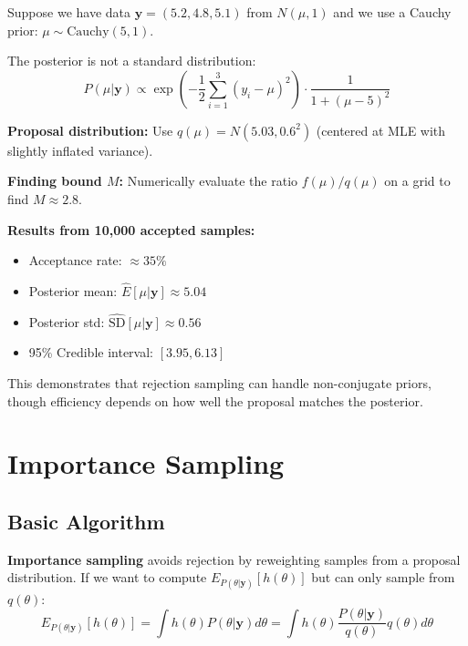 \begin{examplebox}
\begin{example}
Suppose we have data $\mathbf{y} = (5.2, 4.8, 5.1)$ from $N(\mu, 1)$ and we use a Cauchy prior: $\mu \sim \text{Cauchy}(5, 1)$.

The posterior is not a standard distribution:
$$P(\mu|\mathbf{y}) \propto \exp\left(-\frac{1}{2}\sum_{i=1}^3(y_i - \mu)^2\right) \cdot \frac{1}{1 + (\mu-5)^2}$$

\textbf{Proposal distribution:}
Use $q(\mu) = N(5.03, 0.6^2)$ (centered at MLE with slightly inflated variance).

\textbf{Finding bound $M$:}
Numerically evaluate the ratio $f(\mu)/q(\mu)$ on a grid to find $M \approx 2.8$.

\textbf{Results from 10,000 accepted samples:}
\begin{itemize}
\item Acceptance rate: $\approx 35\%$
\item Posterior mean: $\hat{E}[\mu|\mathbf{y}] \approx 5.04$
\item Posterior std: $\hat{\text{SD}}[\mu|\mathbf{y}] \approx 0.56$
\item 95\% Credible interval: $[3.95, 6.13]$
\end{itemize}
This demonstrates that rejection sampling can handle non-conjugate priors, though efficiency depends on how well the proposal matches the posterior.
\end{example}
\end{examplebox}

\section{Importance Sampling}

\subsection{Basic Algorithm}
\textbf{Importance sampling} avoids rejection by reweighting samples from a proposal distribution. If we want to compute $E_{P(\theta|\mathbf{y})}[h(\theta)]$ but can only sample from $q(\theta)$:
\begin{equation}
E_{P(\theta|\mathbf{y})}[h(\theta)] = \int h(\theta) P(\theta|\mathbf{y}) d\theta = \int h(\theta) \frac{P(\theta|\mathbf{y})}{q(\theta)} q(\theta) d\theta
\end{equation}

